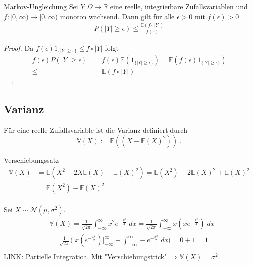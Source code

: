 \begin{Satz}{Markov-Ungleichung }
Sei $Y : \Omega \to \mathbb{R}$  eine  reelle, integrierbare  Zufallsvariablen und $f : [0, \infty) \to [0, \infty)$ monoton wachsend.
Dann gilt für alle $\epsilon > 0$ mit $f(\epsilon) > 0$
\begin{align*}
P (|Y |  \geq \epsilon) \leq \frac{\mathbb{E} (f \circ |Y|)}{f(\epsilon)}
\end{align*}
\end{Satz}
\begin{proof}
Da $f(\epsilon) 1_{\{ |Y| \geq  \epsilon \} } \leq f \circ |Y|$ folgt
\begin{align*}
f(\epsilon) P(|Y| \geq \epsilon) = & f(\epsilon) \mathbb{E}(1_{\{ |Y| \geq  \epsilon \} }) = \mathbb{E}( f(\epsilon) 1_{\{ |Y| \geq  \epsilon \} }) \\
\leq & \mathbb{E}( f \circ |Y|)
\end{align*}
\end{proof}


\subsection{Varianz}

\begin{Definition}
Für eine reelle Zufallsvariable ist die Varianz definiert durch
$$ \mathbb{V} (X) :=  \mathbb{E}( (X - \mathbb{E}(X)^2)) \; .$$
\end{Definition}

\begin{Satz}{Verschiebungssatz}
\begin{align*}
 \mathbb{V}(X) & = \mathbb{E}(X^2 - 2X \mathbb{E}(X) + \mathbb{E}(X)^2) = \mathbb{E}(X^2) - 2 \mathbb{E}(X)^2 +  \mathbb{E}(X)^2 \\
& =  \mathbb{E}(X^2) -  \mathbb{E}(X)^2 \\
\end{align*}
\end{Satz}

\begin{Beispiel}
Sei $X \sim \mathcal{N}(\mu, \sigma^2)$.
\begin{align*}
&\mathbb{V} (X) =  \frac{1}{\sqrt{2 \pi}} \int_{- \infty}^{\infty} x^2 e^{- \frac{x^2}{2}} \; dx =   \frac{1}{\sqrt{2 \pi}} \int_{- \infty}^{\infty} x (xe^{- \frac{x^2}{2}}) \; dx \\
& =  \frac{1}{\sqrt{2 \pi}} \biggl (\biggl [ x (e^{- \frac{x^2}{2}}) \biggr]_{- \infty}^{\infty}   - \int_{- \infty}^{\infty}  - e^{- \frac{x^2}{2}} \; dx  \biggr) = 0 + 1 = 1\\
\end{align*}
\href{https://de.wikipedia.org/wiki/Partielle_Integration}{LINK: Partielle Integration}. Mit "Verschiebungstrick"
$\Rightarrow \mathbb{V}(X) = \sigma^2$.
\end{Beispiel}




